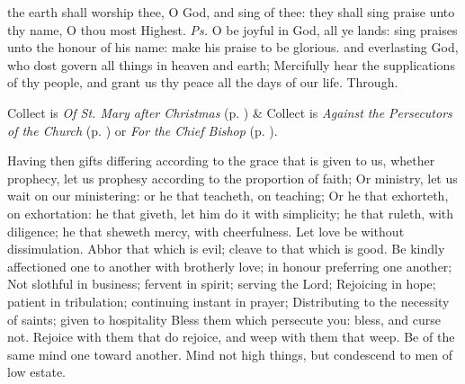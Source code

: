 

\properantiphonfix

\introit
{} the earth shall worship thee, O God, and sing of thee: they shall sing praise unto thy name, O thou most Highest. \textit{Ps.} O be joyful in God, all ye lands: sing praises unto the honour of his name: make his praise to be glorious.
\collect\label{EpiphanyIICollect}
 and everlasting God, who dost govern all things in heaven and earth; Mercifully hear the supplications of thy people, and grant us thy peace all the days of our life. Through.
\begin{rubric}
     Collect is \emph{Of St. Mary after Christmas} (p. \pageref{SPMaryPostChristmas}) \&  Collect is \emph{Against the Persecutors of the Church} (p. \pageref{SPAgainst}) or \emph{For the Chief Bishop} (p. \pageref{SPChiefBishop}).
\end{rubric}
 Having then gifts differing according to the grace that is given to us, whether prophecy, let us prophesy according to the proportion of faith; Or ministry, let us wait on our ministering: or he that teacheth, on teaching; Or he that exhorteth, on exhortation: he that giveth, let him do it with simplicity; he that ruleth, with diligence; he that sheweth mercy, with cheerfulness. Let love be without dissimulation. Abhor that which is evil; cleave to that which is good. Be kindly affectioned one to another with brotherly love; in honour preferring one another; Not slothful in business; fervent in spirit; serving the Lord; Rejoicing in hope; patient in tribulation; continuing instant in prayer; Distributing to the necessity of saints; given to hospitality Bless them which persecute you: bless, and curse not. Rejoice with them that do rejoice, and weep with them that weep. Be of the same mind one toward another. Mind not high things, but condescend to men of low estate.

